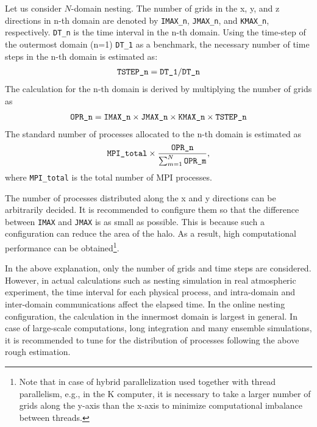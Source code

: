 Let us consider $N$-domain nesting. The number of grids in the x, y, and z directions in n-th domain are denoted by
\verb|IMAX_n|, \verb|JMAX_n|, and \verb|KMAX_n|, respectively.
\verb|DT_n| is the time interval  in the n-th domain.
Using the time-step of the outermost domain (n=1) \verb|DT_1| as a benchmark,
the necessary number of time steps in the n-th domain is estimated as:
\begin{eqnarray}
 \verb|TSTEP_n| = \verb|DT_1| / \verb|DT_n|  \nonumber
\end{eqnarray}
The calculation for the n-th domain is derived by multiplying the number of grids as
\begin{eqnarray}
 \verb|OPR_n| = \verb|IMAX_n| \times \verb|JMAX_n| \times \verb|KMAX_n| \times \verb|TSTEP_n| \nonumber
\end{eqnarray}
The standard number of processes allocated to the n-th domain is estimated as
\begin{eqnarray}
 \verb|MPI_total| \times \frac{ \texttt{OPR\_n} }{ \sum_{m=1}^N \texttt{OPR\_m} },
\end{eqnarray}
where \verb|MPI_total| is the total number of MPI processes.

The number of processes distributed along the x and y directions  can be arbitrarily decided.
It is recommended to configure them so that the difference between \verb|IMAX| and \verb|JMAX| is as small as possible. This is because such a configuration can reduce the area of the halo. As a result, high computational performance can be obtained\footnote{Note that in case of hybrid parallelization used together with thread parallelism,  e.g., in the K computer, it is necessary to take a larger number of grids along the y-axis than the x-axis to minimize computational imbalance between threads.}. 


In the above explanation, only the number of grids and time steps are considered. However, in actual calculations such as nesting simulation in real atmospheric experiment, the time interval for each physical process, and intra-domain and inter-domain communications affect the elapsed time. In the online nesting configuration, the calculation in the innermost domain is largest in general.  In case of large-scale computations, long integration and many ensemble simulations, it is recommended to tune for the distribution of processes following the above rough estimation.

